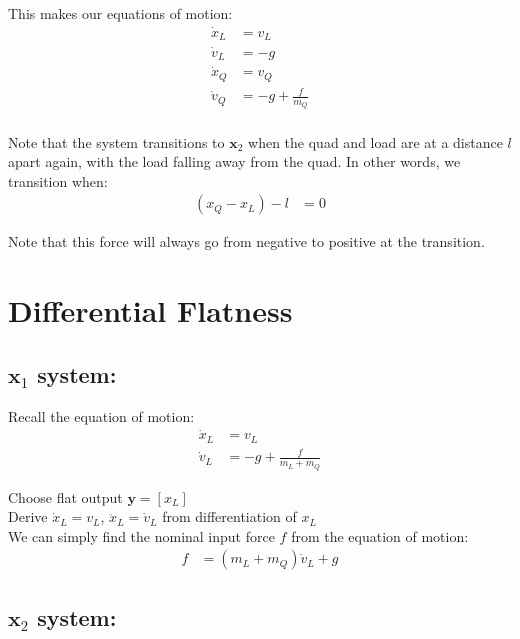 \documentclass[11pt]{article}
\begin{document}
This makes our equations of motion: 
\begin{align*}
\dot{x}_L &= v_L \\
\dot{v}_L &= -g \\ 
\dot{x}_Q &= v_Q \\
\dot{v}_Q &= -g + \frac{f}{m_Q} \\
\end{align*} 


Note that the system transitions to $\mathbf{x}_2$ when the quad and load are at a distance $l$ apart again, with the load falling away from the quad. In other words, we transition when: 
\begin{align*}
(x_Q - x_L) - l &= 0
\end{align*}

Note that this force will always go from negative to positive at the transition. 






\newpage
\section{Differential Flatness} 
\subsection{$\mathbf{x}_1$ system:} 

Recall the equation of motion: 
\begin{align*}
\dot{x}_L &= v_L \\
\dot{v}_L &= -g +\frac{f}{m_L+m_Q}
\end{align*}




Choose flat output $\mathbf{y} = [{x}_L]$  \\

\mbox{} \newline
Derive $\dot{x}_L = v_{L}$, $\ddot{x}_L = \dot{v}_{L}$ from differentiation of $x_L$ \\
We can simply find the nominal input force $f$ from the equation of motion:
\begin{align*}
f &= (m_L+m_Q) \dot{v}_L + g
\end{align*}







\subsection{$\mathbf{x}_2$ system:}
\end{document}
